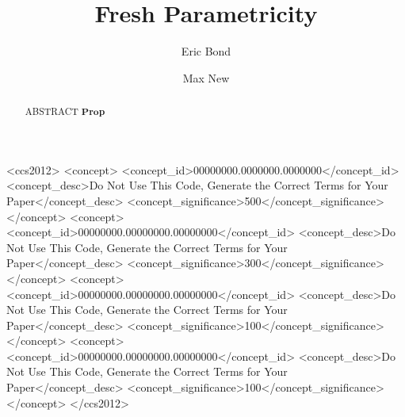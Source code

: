 \documentclass[acmsmall]{acmart}
\newcommand{\Prop}{\mathbf{Prop}}
\begin{document}
\title{Fresh Parametricity}


\author{Eric Bond}

\author{Max New}



\begin{abstract}
  ABSTRACT 
  $\Prop$
\end{abstract}

\begin{CCSXML}
<ccs2012>
 <concept>
  <concept_id>00000000.0000000.0000000</concept_id>
  <concept_desc>Do Not Use This Code, Generate the Correct Terms for Your Paper</concept_desc>
  <concept_significance>500</concept_significance>
 </concept>
 <concept>
  <concept_id>00000000.00000000.00000000</concept_id>
  <concept_desc>Do Not Use This Code, Generate the Correct Terms for Your Paper</concept_desc>
  <concept_significance>300</concept_significance>
 </concept>
 <concept>
  <concept_id>00000000.00000000.00000000</concept_id>
  <concept_desc>Do Not Use This Code, Generate the Correct Terms for Your Paper</concept_desc>
  <concept_significance>100</concept_significance>
 </concept>
 <concept>
  <concept_id>00000000.00000000.00000000</concept_id>
  <concept_desc>Do Not Use This Code, Generate the Correct Terms for Your Paper</concept_desc>
  <concept_significance>100</concept_significance>
 </concept>
</ccs2012>
\end{CCSXML}




\end{document}
